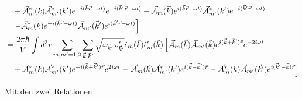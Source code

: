 \begin{align}
&\quad +  \vec{\mathcal A}^*_m (k) \vec{\mathcal A}^*_{m'} (k') e^{-i(\vec k\vec r-\omega t)}e^{-i(\vec k'\vec r-\omega t)} - \vec{\mathcal A}_{m} (\vec k)  e^{i(\vec k\vec r-\omega t)}\vec{\mathcal A}^*_{m'} (k') e^{-i(\vec k'\vec r-\omega t)} \notag\\
&\quad\left. - \vec{\mathcal A}^*_m (k) e^{-i(\vec k\vec r-\omega t)}\vec{\mathcal A}_{m'} (\vec k')  e^{i(\vec k'\vec r-\omega t)}   \right]\notag\\
%
&= \frac{2\pi\hbar}{V} \int d^3r  \sum_{m,m'=1,2} \sum_{\vec k,\vec k'}   \sqrt{\omega_{\vec k'}\omega'_{\vec k'}} \hat \epsilon_m(\vec k) \hat \epsilon'_m(\vec k)  
\left[ \vec{\mathcal A}_m (\vec k) \vec{\mathcal A}_{m'} (\vec k)e^{i(\vec k+\vec k')\vec r}e^{-2i\omega t} + \right. \notag\\
&\quad +  \vec{\mathcal A}^*_m (k) \vec{\mathcal A}^*_{m'} (k') e^{-i(\vec k+\vec k')\vec r}e^{2i\omega t} 
- \left.\vec{\mathcal A}_{m} (\vec k)  \vec{\mathcal A}^*_{m'} (k') e^{i(\vec k-\vec k')\vec r} 
 - \vec{\mathcal A}^*_m (k) \vec{\mathcal A}_{m'} (\vec k') e^{i(\vec k'-\vec k)\vec r}    \right]
\end{align}

Mit den zwei Relationen

